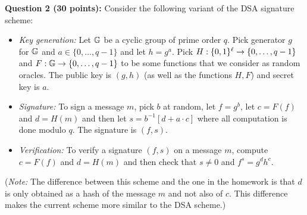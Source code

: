 \documentclass{article}
\begin{document}
\noindent{}\textbf{Question 2 (30 points):} Consider the following variant of the DSA signature scheme:%

\begin{itemize}%

\item{}
\emph{Key generation:} Let $\mathbb{G}$ be a cyclic group of prime order $q$. Pick generator $g$ for $\mathbb{G}$ and $a\in \{0,\ldots,q-1\}$ and let $h=g^a$. Pick $H:\{0,1\}^\ell \rightarrow \{0,\ldots,q-1\}$ and $F:\mathbb{G}\rightarrow\{0,\ldots,q-1\}$ to be some  functions that we consider as random oracles. The public key is $(g,h)$  (as well as the functions $H,F$) and secret key is $a$.%

\item{}
\emph{Signature:} To sign a message $m$, pick $b$ at random,  let $f=g^b$, let $c=F(f)$ and $d=H(m)$  and then let $s= b^{-1}[d+a\cdot c]$ where all computation is done modulo $q$. The signature is $(f,s)$.%

\item{}
\emph{Verification:} To verify a signature $(f,s)$ on a message $m$, compute $c=F(f)$ and $d=H(m)$  and then check that $s\neq 0$ and $f^s=g^{d}h^{c}$.%
\end{itemize}%

\noindent{}(\emph{Note:} The difference between this scheme and the one in the homework is that $d$ is only obtained as a hash of the message $m$ and not also of $c$. This difference makes the current scheme more similar to the DSA scheme.)%
\end{document}
